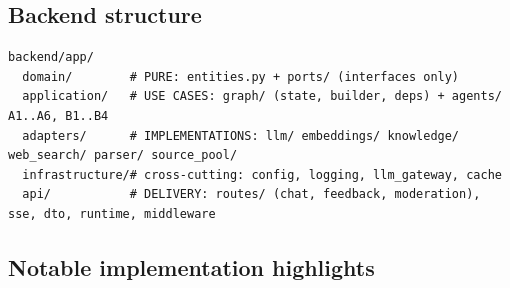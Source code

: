 \documentclass[11pt,a4paper]{article}
\begin{document}
\subsection{Backend structure}
\begin{lstlisting}[caption={Backend layout (hexagonal).},label={lst:tree}]
backend/app/
  domain/        # PURE: entities.py + ports/ (interfaces only)
  application/   # USE CASES: graph/ (state, builder, deps) + agents/ A1..A6, B1..B4
  adapters/      # IMPLEMENTATIONS: llm/ embeddings/ knowledge/ web_search/ parser/ source_pool/
  infrastructure/# cross-cutting: config, logging, llm_gateway, cache
  api/           # DELIVERY: routes/ (chat, feedback, moderation), sse, dto, runtime, middleware
\end{lstlisting}

\subsection{Notable implementation highlights}
\end{document}
